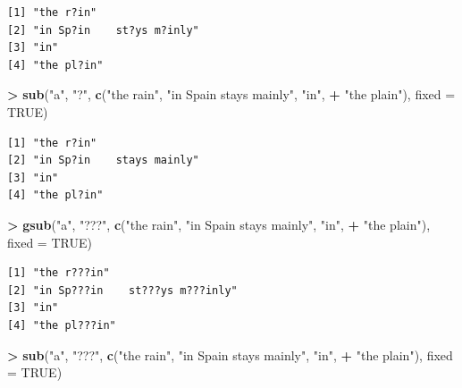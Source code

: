 \documentclass[
]{krantz}
\makeatletter
\newenvironment{Shaded}{\begin{snugshade}}{\end{snugshade}}
\newcommand{\DataTypeTok}[1]{\textcolor[rgb]{0.27,0.27,0.27}{#1}}
\newcommand{\KeywordTok}[1]{\textcolor[rgb]{0.27,0.27,0.27}{\textbf{#1}}}
\newcommand{\NormalTok}[1]{#1}
\newcommand{\OperatorTok}[1]{\textcolor[rgb]{0.43,0.43,0.43}{\textbf{#1}}}
\newcommand{\OtherTok}[1]{\textcolor[rgb]{0.37,0.37,0.37}{#1}}
\newcommand{\StringTok}[1]{\textcolor[rgb]{0.5,0.5,0.5}{#1}}
\newenvironment{kframe}{%
\medskip{}
\setlength{\fboxsep}{.8em}
 \def\at@end@of@kframe{}%
 \ifinner\ifhmode%
  \def\at@end@of@kframe{\end{minipage}}%
  \begin{minipage}{\columnwidth}%
 \fi\fi%
 \def\FrameCommand##1{\hskip\@totalleftmargin \hskip-\fboxsep
 \colorbox{shadecolor}{##1}\hskip-\fboxsep
     \hskip-\linewidth \hskip-\@totalleftmargin \hskip\columnwidth}%
 \MakeFramed {\advance\hsize-\width
   \@totalleftmargin\z@ \linewidth\hsize
   \@setminipage}}%
 {\par\unskip\endMakeFramed%
 \at@end@of@kframe}
\renewenvironment{Shaded}{\begin{kframe}}{\end{kframe}}
\makeatother
\begin{document}
\begin{verbatim}
[1] "the r?in"                
[2] "in Sp?in    st?ys m?inly"
[3] "in"                      
[4] "the pl?in"               
\end{verbatim}

\begin{Shaded}
\begin{Highlighting}[]
\OperatorTok{\textgreater{}}\StringTok{ }\KeywordTok{sub}\NormalTok{(}\StringTok{"a"}\NormalTok{, }\StringTok{"?"}\NormalTok{, }\KeywordTok{c}\NormalTok{(}\StringTok{"the rain"}\NormalTok{, }\StringTok{"in Spain    stays mainly"}\NormalTok{, }\StringTok{"in"}\NormalTok{, }
\OperatorTok{+}\StringTok{                 "the plain"}\NormalTok{), }\DataTypeTok{fixed =} \OtherTok{TRUE}\NormalTok{)}
\end{Highlighting}
\end{Shaded}

\begin{verbatim}
[1] "the r?in"                
[2] "in Sp?in    stays mainly"
[3] "in"                      
[4] "the pl?in"               
\end{verbatim}

\begin{Shaded}
\begin{Highlighting}[]
\OperatorTok{\textgreater{}}\StringTok{ }\KeywordTok{gsub}\NormalTok{(}\StringTok{"a"}\NormalTok{, }\StringTok{"???"}\NormalTok{, }\KeywordTok{c}\NormalTok{(}\StringTok{"the rain"}\NormalTok{, }\StringTok{"in Spain    stays mainly"}\NormalTok{, }\StringTok{"in"}\NormalTok{, }
\OperatorTok{+}\StringTok{                    "the plain"}\NormalTok{), }\DataTypeTok{fixed =} \OtherTok{TRUE}\NormalTok{)}
\end{Highlighting}
\end{Shaded}

\begin{verbatim}
[1] "the r???in"                    
[2] "in Sp???in    st???ys m???inly"
[3] "in"                            
[4] "the pl???in"                   
\end{verbatim}

\begin{Shaded}
\begin{Highlighting}[]
\OperatorTok{\textgreater{}}\StringTok{ }\KeywordTok{sub}\NormalTok{(}\StringTok{"a"}\NormalTok{, }\StringTok{"???"}\NormalTok{, }\KeywordTok{c}\NormalTok{(}\StringTok{"the rain"}\NormalTok{, }\StringTok{"in Spain    stays mainly"}\NormalTok{, }\StringTok{"in"}\NormalTok{, }
\OperatorTok{+}\StringTok{                   "the plain"}\NormalTok{), }\DataTypeTok{fixed =} \OtherTok{TRUE}\NormalTok{)}
\end{Highlighting}
\end{Shaded}
\end{document}
